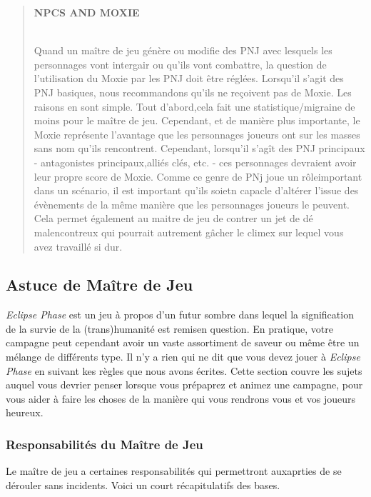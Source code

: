 {\begin{quotation} \begin{large} \textbf{NPCS AND MOXIE} \end{large} \\ Quand un maître de jeu génère ou modifie des PNJ avec lesquels les personnages vont intergair ou qu'ils vont combattre, la question de l'utilisation du Moxie par les PNJ doit être réglées. Lorsqu'il s'agit des PNJ basiques, nous recommandons qu'ils ne reçoivent pas de Moxie. Les raisons en sont simple. Tout d'abord,cela fait une statistique/migraine de moins pour le maître de jeu. Cependant, et de manière plus importante, le Moxie représente l'avantage que les personnages joueurs ont sur les masses sans nom qu'ils rencontrent. Cependant, lorsqu'il s'agît des PNJ principaux - antagonistes principaux,alliés clés, etc. - ces personnages devraient avoir leur propre score de Moxie. Comme ce genre de PNj joue un rôleimportant dans un scénario, il est important qu'ils soietn capacle d'altérer l'issue des évènements de la même manière que les personnages joueurs le peuvent. Cela permet également au maitre de jeu de contrer un jet de dé malencontreux qui pourrait autrement gâcher le climex sur lequel vous avez travaillé si dur. \end{quotation} 

\subsection{Astuce de Maître de Jeu} 

\textit{Eclipse Phase} est un jeu à propos d'un futur sombre dans lequel la signification de la survie de la (trans)humanité est remisen question. En pratique, votre campagne peut cependant avoir un vaste assortiment de saveur ou même être un mélange de différents type. Il n'y a rien qui ne dit que vous devez jouer à \textit{Eclipse Phase} en suivant kes règles que nous avons écrites. Cette section couvre les sujets auquel vous devrier penser lorsque vous prépaprez et animez une campagne, pour vous aider à faire les choses de la manière qui vous rendrons vous et vos joueurs heureux. 

\subsubsection{Responsabilités du Maître de Jeu} 

Le maître de jeu a certaines responsabilités qui permettront auxaprties de se dérouler sans incidents. Voici un court récapitulatifs des bases. 

}
